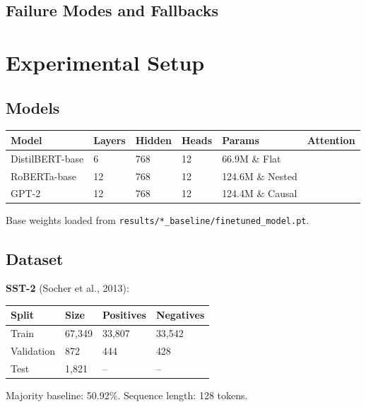 \subsection{Failure Modes and Fallbacks}



\section{Experimental Setup}

\subsection{Models}

\begin{table}[H]
\centering
\small
\begin{tabular}{llllll}
\toprule
\textbf{Model} & \textbf{Layers} & \textbf{Hidden} & \textbf{Heads} & \textbf{Params} & \textbf{Attention} \\
\midrule
DistilBERT-base & 6 & 768 & 12 & 66.9M \& Flat \\
RoBERTa-base & 12 & 768 & 12 & 124.6M \& Nested \\
GPT-2 & 12 & 768 & 12 & 124.4M \& Causal \\
\bottomrule
\end{tabular}
\end{table}

Base weights loaded from \texttt{results/*\_baseline/finetuned\_model.pt}.

\subsection{Dataset}

\textbf{SST-2} (Socher et al., 2013):

\begin{table}[H]
\centering
\small
\begin{tabular}{llll}
\toprule
\textbf{Split} & \textbf{Size} & \textbf{Positives} & \textbf{Negatives} \\
\midrule
Train & 67,349 & 33,807 & 33,542 \\
Validation & 872 & 444 & 428 \\
Test & 1,821 & -- & -- \\
\bottomrule
\end{tabular}
\end{table}

Majority baseline: 50.92\%. Sequence length: 128 tokens.

